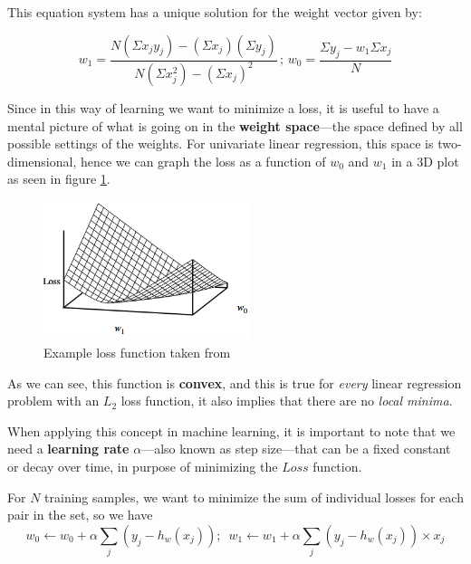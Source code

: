 \documentclass[10pt]{article}
\begin{document}
This equation system has a unique solution for the weight vector given by: \par
\begin{equation*}
    w_{1} = \frac{N(\Sigma x_{j}y_{j}) - (\Sigma x_{j})(\Sigma y_{j})}{N(\Sigma x_{j}^{2}) - (\Sigma x_{j})^2} \,;\, w_{0} = \frac{\Sigma y_{j} - w_{1}\Sigma x_{j}}{N}
\end{equation*}

Since in this way of learning we want to minimize a loss, it is useful to have a mental picture of what is going on in the \textbf{weight space}---the space defined by all possible settings of the weights. For univariate linear regression, this space is two-dimensional, hence we can graph the loss as a function of $w_{0}$ and $w_{1}$ in a 3D plot as seen in figure \ref{fig:loss_function}. \par

\newpage

\begin{figure}[h]
    \centering
    \includegraphics[width=60mm]{2025-03-26-09-24-32.png}
    \caption{Example loss function taken from \cite{ai}}
    \label{fig:loss_function}
\end{figure}

As we can see, this function is \textbf{convex}, and this is true for \textit{every} linear regression problem with an $L_{2}$ loss function, it also implies that there are no \textit{local minima}. \cite{ai} \par

When applying this concept in machine learning, it is important to note that we need a \textbf{learning rate} $\alpha$---also known as step size---that can be a fixed constant or decay over time, in purpose of minimizing the $Loss$ function. \par

For $N$ training samples, we want to minimize the sum of individual losses for each pair in the set, so we have
\begin{equation*}
    w_{0} \leftarrow w_{0} + \alpha\sum_{j}(y_{j} - h_{w}(x_{j})); \,\,\, w_{1} \leftarrow w_{1} + \alpha\sum_{j}(y_{j} - h_{w}(x_{j})) \times x_{j}
\end{equation*}
\end{document}
